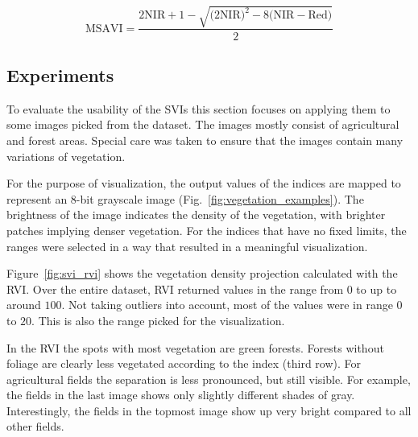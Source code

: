 \begin{equation}
    \displaystyle
    \text{MSAVI} = \frac
    {
    2 \text{NIR} + 1
    - \sqrt{
    \big(2 \text{NIR}\big)^2
    - 8 \big(\text{NIR} - \text{Red}\big)
    }
    }
    {2}
    \label{eq:msavi}
\end{equation}

\subsection{Experiments}
To evaluate the usability of the SVIs this section focuses on applying them to some images picked from the dataset. The images mostly consist of agricultural and forest areas. Special care was taken to ensure that the images contain many variations of vegetation.

For the purpose of visualization, the output values of the indices are mapped to represent an 8-bit grayscale image (Fig.~\ref{fig:vegetation_examples}). The brightness of the image indicates the density of the vegetation, with brighter patches implying denser vegetation. For the indices that have no fixed limits, the ranges were selected in a way that resulted in a meaningful visualization.

Figure~\ref{fig:svi_rvi} shows the vegetation density projection calculated with the RVI. Over the entire dataset, RVI returned values in the range from $0$ to up to around $100$. Not taking outliers into account, most of the values were in range $0$ to $20$. This is also the range picked for the visualization.

In the RVI the spots with most vegetation are green forests. Forests without foliage are clearly less vegetated according to the index (third row). For agricultural fields the separation is less pronounced, but still visible. For example, the fields in the last image shows only slightly different shades of gray. Interestingly, the fields in the topmost image show up very bright compared to all other fields.

